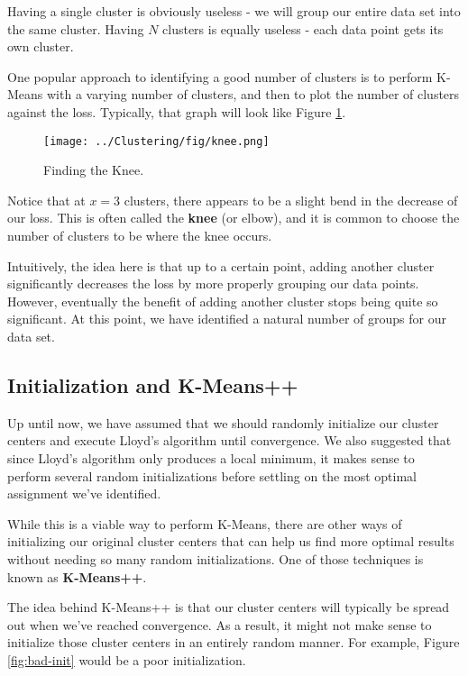 Having a single cluster is obviously useless - we will group our entire data set into the same cluster. Having $N$ clusters is equally useless - each data point gets its own cluster.

One popular approach to identifying a good number of clusters is to perform K-Means with a varying number of clusters, and then to plot the number of clusters against the loss. Typically, that graph will look like Figure \ref{fig:knee}.

\begin{figure}
    \centering
    \texttt{[image: ../Clustering/fig/knee.png]}
    \caption{Finding the Knee.}
    \label{fig:knee}
\end{figure}

Notice that at $x=3$ clusters, there appears to be a slight bend in the decrease of our loss. This is often called the \textbf{knee} (or elbow), and it is common to choose the number of clusters to be where the knee occurs.

Intuitively, the idea here is that up to a certain point, adding another cluster significantly decreases the loss by more properly grouping our data points. However, eventually the benefit of adding another cluster stops being quite so significant. At this point, we have identified a natural number of groups for our data set.

\subsection{Initialization and K-Means++}
Up until now, we have assumed that we should randomly initialize our cluster centers and execute Lloyd's algorithm until convergence. We also suggested that since Lloyd's algorithm only produces a local minimum, it makes sense to perform several random initializations before settling on the most optimal assignment we've identified.

While this is a viable way to perform K-Means, there are other ways of initializing our original cluster centers that can help us find more optimal results without needing so many random initializations. One of those techniques is known as \textbf{K-Means++}.

The idea behind K-Means++ is that our cluster centers will typically be spread out when we've reached convergence. As a result, it might not make sense to initialize those cluster centers in an entirely random manner. For example, Figure \ref{fig:bad-init} would be a poor initialization.

